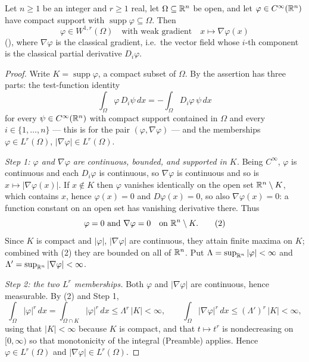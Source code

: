 \begin{lemma}
Let $n\ge1$ be an integer and $r\ge1$ real, let $\Omega\subseteq\mathbb{R}^n$ be open,
and let $\varphi\in C^\infty(\mathbb{R}^n)$ have compact support with
$\operatorname{supp}\varphi\subseteq\Omega$.  Then
\[
\varphi\in W^{1,r}(\Omega)\quad\text{with weak gradient}\quad
x\longmapsto\nabla\varphi(x)
\]
(), where $\nabla\varphi$ is the classical gradient, i.e.\ the
vector field whose $i$-th component is the classical partial derivative
$D_i\varphi$.
\end{lemma}
\begin{proof}
Write $K=\operatorname{supp}\varphi$, a compact subset of $\Omega$.  By
 the assertion has three parts: the test-function identity
\[
\int_\Omega\varphi\,D_i\psi\,dx=-\int_\Omega D_i\varphi\,\psi\,dx
\tag{1}
\]
for every $\psi\in C^\infty(\mathbb{R}^n)$ with compact support contained in $\Omega$
and every $i\in\{1,\dots,n\}$ --- this is  for the
pair $(\varphi,\nabla\varphi)$ --- and the memberships $\varphi\in L^r(\Omega)$,
$|\nabla\varphi|\in L^r(\Omega)$.

\emph{Step 1: $\varphi$ and $\nabla\varphi$ are continuous, bounded, and
supported in $K$.}  Being $C^\infty$, $\varphi$ is continuous and each
$D_i\varphi$ is continuous, so $\nabla\varphi$ is continuous and so is
$x\mapsto|\nabla\varphi(x)|$.  If $x\notin K$ then $\varphi$ vanishes
identically on the open set $\mathbb{R}^n\setminus K$, which contains $x$, hence
$\varphi(x)=0$ and $D\varphi(x)=0$, so also $\nabla\varphi(x)=0$: a function
constant on an open set has vanishing derivative there.  Thus
\[
\varphi=0\ \text{and}\ \nabla\varphi=0\quad\text{on }\R^n\setminus K .
\tag{2}
\]
Since $K$ is compact and $|\varphi|$, $|\nabla\varphi|$ are continuous, they
attain finite maxima on $K$; combined with (2) they are bounded on all of
$\mathbb{R}^n$.  Put
$\Lambda=\sup_{\mathbb{R}^n}|\varphi|<\infty$ and
$\Lambda'=\sup_{\mathbb{R}^n}|\nabla\varphi|<\infty$.

\emph{Step 2: the two $L^r$ memberships.}  Both $\varphi$ and
$|\nabla\varphi|$ are continuous, hence measurable.  By (2) and Step 1,
\[
\int_\Omega|\varphi|^r\,dx=\int_{\Omega\cap K}|\varphi|^r\,dx
\le\Lambda^r\,|K|<\infty ,
\qquad
\int_\Omega|\nabla\varphi|^r\,dx\le(\Lambda')^r\,|K|<\infty ,
\]
using that $|K|<\infty$ because $K$ is compact, and that $t\mapsto t^r$ is
nondecreasing on $[0,\infty)$ so that monotonicity of the integral (Preamble)
applies.  Hence $\varphi\in L^r(\Omega)$ and $|\nabla\varphi|\in L^r(\Omega)$.


\end{proof}
